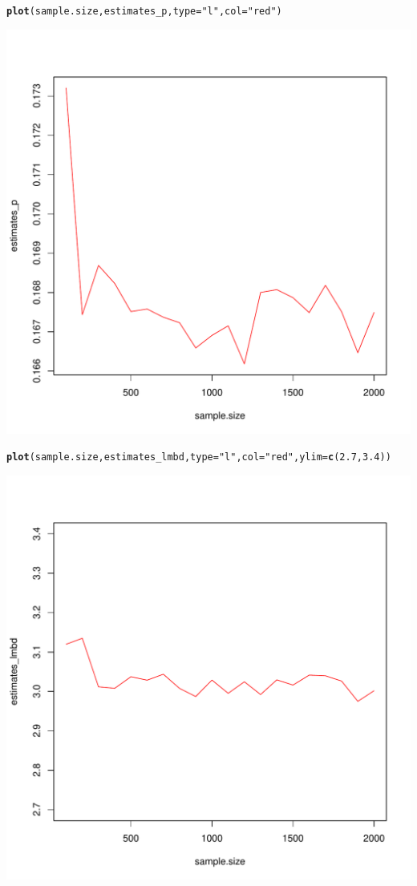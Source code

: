 \documentclass{article}\usepackage[]{graphicx}\usepackage[]{color}
\makeatletter
\def\maxwidth{ %
  \ifdim\Gin@nat@width>\linewidth
    \linewidth
  \else
    \Gin@nat@width
  \fi
}
\newcommand{\hlnum}[1]{\textcolor[rgb]{0.686,0.059,0.569}{#1}}%
\newcommand{\hlstr}[1]{\textcolor[rgb]{0.192,0.494,0.8}{#1}}%
\newcommand{\hlstd}[1]{\textcolor[rgb]{0.345,0.345,0.345}{#1}}%
\newcommand{\hlkwc}[1]{\textcolor[rgb]{0.333,0.667,0.333}{#1}}%
\newcommand{\hlkwd}[1]{\textcolor[rgb]{0.737,0.353,0.396}{\textbf{#1}}}%
\newenvironment{kframe}{%
 \def\at@end@of@kframe{}%
 \ifinner\ifhmode%
  \def\at@end@of@kframe{\end{minipage}}%
  \begin{minipage}{\columnwidth}%
 \fi\fi%
 \def\FrameCommand##1{\hskip\@totalleftmargin \hskip-\fboxsep
 \colorbox{shadecolor}{##1}\hskip-\fboxsep
     \hskip-\linewidth \hskip-\@totalleftmargin \hskip\columnwidth}%
 \MakeFramed {\advance\hsize-\width
   \@totalleftmargin\z@ \linewidth\hsize
   \@setminipage}}%
 {\par\unskip\endMakeFramed%
 \at@end@of@kframe}
\newenvironment{knitrout}{}{} %
\makeatother
\begin{document}
\begin{knitrout}
\begin{kframe}
\begin{alltt}
\hlkwd{plot}\hlstd{(sample.size, estimates_p,} \hlkwc{type} \hlstd{=} \hlstr{"l"}\hlstd{,} \hlkwc{col} \hlstd{=} \hlstr{"red"}\hlstd{)}
\end{alltt}
\end{kframe}
\includegraphics[width=\maxwidth]{figure/unnamed-chunk-9-1} 
\begin{kframe}\begin{alltt}
\hlkwd{plot}\hlstd{(sample.size, estimates_lmbd,} \hlkwc{type} \hlstd{=} \hlstr{"l"}\hlstd{,} \hlkwc{col} \hlstd{=} \hlstr{"red"}\hlstd{,} \hlkwc{ylim}\hlstd{=}\hlkwd{c}\hlstd{(}\hlnum{2.7}\hlstd{,} \hlnum{3.4}\hlstd{))}
\end{alltt}
\end{kframe}
\includegraphics[width=\maxwidth]{figure/unnamed-chunk-9-2} 


\end{knitrout}
\end{document}
